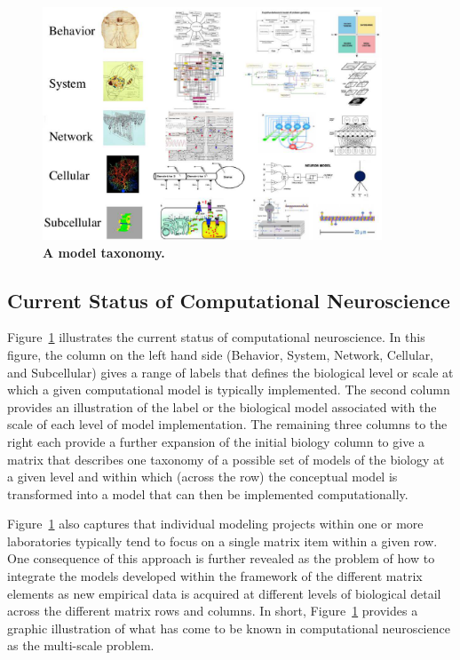 \documentclass[11pt,3p,twocolumn]{JMN}
\begin{document}
\begin{figure}[h!t]
  \begin{center}
    \includegraphics[width=0.9\textwidth]{figures/multi-scale-taxonomy-no-arrows-no-texts.pdf}
    \caption{ \small{\bf A model taxonomy.} }
  \end{center}
  \label{fig:multi-scale-taxonomy}
\end{figure}

\subsection{Current Status of Computational Neuroscience}

Figure~\ref{fig:multi-scale-taxonomy} illustrates the current status of computational neuroscience. In this figure, the column on the left hand side (Behavior, System, Network, Cellular, and Subcellular) gives a range of labels that defines the biological level or scale at which a given computational model is typically implemented. The second column provides an illustration of the label or the biological model associated with the scale of each level of model implementation. The remaining three columns to the right each provide a further expansion of the initial biology column to give a matrix that describes one taxonomy of a possible set of models of the biology at a given level and within which (across the row) the conceptual model is transformed into a model that can then be implemented computationally.

Figure~\ref{fig:multi-scale-taxonomy} also captures that individual modeling projects within one or more laboratories typically tend to focus on a single matrix item within a given row. One consequence of this approach is further revealed as the problem of how to integrate the models developed within the framework of the different matrix elements as new empirical data is acquired at different levels of biological detail across the different matrix rows and columns. In short, Figure~\ref{fig:multi-scale-taxonomy} provides a graphic illustration of what has come to be known in computational neuroscience as the multi-scale problem.
\end{document}
